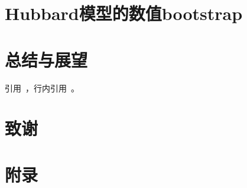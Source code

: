 \documentclass[oneside]{fduthesis}
\begin{document}
\chapter{Hubbard模型的数值bootstrap}

\section{}

\chapter{总结与展望}


引用~\cite{feynman2011feynman}，行内引用~\parencite{feynman2011feynman}。

\backmatter

\printbibliography

\chapter{致\quad 谢}

\chapter{附\quad 录}
\end{document}
